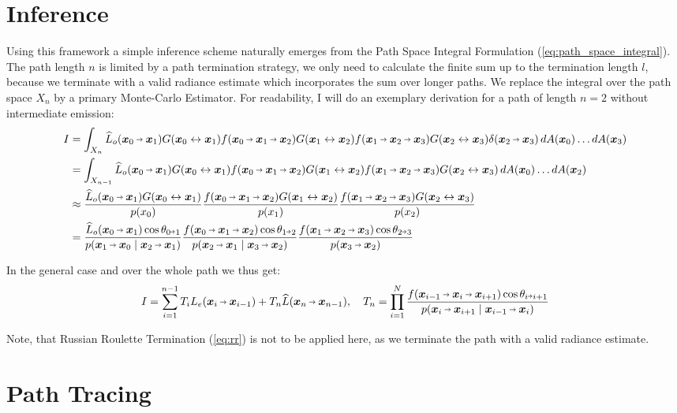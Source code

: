 \section{Inference}
Using this framework a simple inference scheme naturally emerges from the Path Space Integral Formulation (\autoref{eq:path_space_integral}).
The path length $n$ is limited by a path termination strategy, we only need to calculate the finite sum up to the termination length $l$, because we terminate with a valid radiance estimate which incorporates the sum over longer paths.
We replace the integral over the path space $X_n$ by a primary Monte-Carlo Estimator.
For readability, I will do an exemplary derivation for a path of length $n=2$ without intermediate emission:
\begin{equation}
\begin{aligned}
    I
    &= \int_{X_n} \widehat{L}_o(\pdir{0}{1}) \G{0}{1} \f{0}{1}{2} \G{1}{2} \f{1}{2}{3} \G{2}{3} \delta(\pdir{2}{3}) \diff A(\vec{x}_0) \dots \diff A(\vec{x}_3)\\
    &= \int_{X_{n-1}} \widehat{L}_o(\pdir{0}{1}) \G{0}{1} \f{0}{1}{2} \G{1}{2} \f{1}{2}{3} \G{2}{3} \diff A(\vec{x}_0) \dots \diff A(\vec{x}_2)\\
    &\approx \frac{\widehat{L}_o(\pdir{0}{1}) \G{0}{1}}{p(x_0)}  \frac{\f{0}{1}{2} \G{1}{2}}{p(x_1)} \frac{\f{1}{2}{3} \G{2}{3}}{p(x_2)}\\
    &= \frac{\widehat{L}_o(\pdir{0}{1}) \cos\theta_{0\veryshortarrow1}}{p(\pdir{1}{0}\mid\pdir{2}{1})}  \frac{\f{0}{1}{2} \cos\theta_{1\veryshortarrow2}}{p(\pdir{2}{1}\mid\pdir{3}{2})} \frac{\f{1}{2}{3} \cos\theta_{2\veryshortarrow3}}{p(\pdir{3}{2})}\\
\end{aligned}
\end{equation}

In the general case and over the whole path we thus get:
\begin{equation}
\label{eq:inference}
    I
    = \sum_{i=1}^{n-1} T_i L_e(\pdir{i}{i-1}) + T_n \widehat{L}(\pdir{n}{n-1}), \quad
    T_n
    = \prod_{i=1}^{N} \frac{f(\ptrip{i-1}{i}{i+1}) \cos \theta_{i \veryshortarrow i+1}}{p(\pdir{i}{i+1} \mid \pdir{i-1}{i})}
\end{equation}

Note, that Russian Roulette Termination (\autoref{eq:rr}) is not to be applied here, as we terminate the path with a valid radiance estimate.

\section{Path Tracing}

